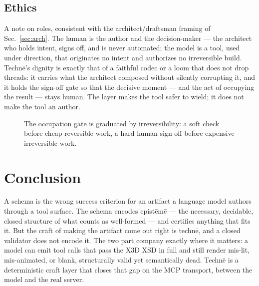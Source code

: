 \documentclass[sigconf,nonacm,screen,anonymous]{acmart}
\begin{document}
\subsection{Ethics}
A note on roles, consistent with the architect/draftsman framing of Sec.~\ref{sec:arch}. The human is the author and the decision-maker --- the architect who holds intent, signs off, and is never automated; the model is a tool, used under direction, that originates no intent and authorizes no irreversible build. Technē's dignity is exactly that of a faithful codec or a loom that does not drop threads: it carries what the architect composed without silently corrupting it, and it holds the sign-off gate so that the decisive moment --- and the act of occupying the result --- stays human. The layer makes the tool safer to wield; it does not make the tool an author.


\begin{figure}[t]\centering
{}
\caption{The occupation gate is graduated by irreversibility: a soft check before
cheap reversible work, a hard human sign-off before expensive irreversible work.}
\label{fig:gate}
\end{figure}

\section{Conclusion}\label{sec:conclusion}

A schema is the wrong success criterion for an artifact a language model authors through a tool surface. The schema encodes epistēmē --- the necessary, decidable, closed structure of what counts as well-formed --- and certifies anything that fits it. But the craft of making the artifact come out right is technē, and a closed validator does not encode it. The two part company exactly where it matters: a model can emit tool calls that pass the X3D XSD in full and still render mis-lit, mis-animated, or blank, structurally valid yet semantically dead. Technē is a deterministic craft layer that closes that gap on the MCP transport, between the model and the real server.
\end{document}
